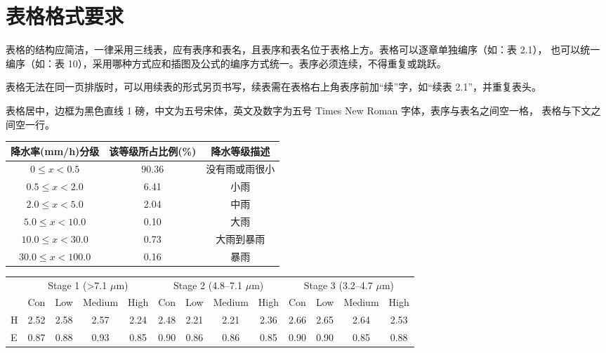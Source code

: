 \section{表格格式要求}

表格的结构应简洁，一律采用三线表，应有表序和表名，且表序和表名位于表格上方。表格可以逐章单独编序（如：表 2.1），
也可以统一编序（如：表 10），采用哪种方式应和插图及公式的编序方式统一。表序必须连续，不得重复或跳跃。

表格无法在同一页排版时，可以用续表的形式另页书写，续表需在表格右上角表序前加“续”字，如“续表 2.1”，并重复表头。

表格居中，边框为黑色直线 1 磅，中文为五号宋体，英文及数字为五号 Times New Roman 字体，表序与表名之间空一格，
表格与下文之间空一行。

\begin{center}
  {\songti\fontsize{10.5pt}{12.6pt}\selectfont
  \begin{tabular}{cccc}
    \toprule
    降水率(mm/h)分级 & 该等级所占比例(\%) & \multicolumn{2}{c}{降水等级描述} \\
    \midrule
    $0 \le x < 0.5$     & 90.36 & \multicolumn{2}{c}{没有雨或雨很小} \\
    $0.5 \le x < 2.0$   & 6.41  & \multicolumn{2}{c}{小雨} \\
    $2.0 \le x < 5.0$   & 2.04  & \multicolumn{2}{c}{中雨} \\
    $5.0 \le x < 10.0$  & 0.10  & \multicolumn{2}{c}{大雨} \\
    $10.0 \le x < 30.0$ & 0.73  & \multicolumn{2}{c}{大雨到暴雨} \\
    $30.0 \le x < 100.0$ & 0.16 & \multicolumn{2}{c}{暴雨} \\
    \bottomrule
  \end{tabular}
  }
\end{center}

\begin{center}
  {\songti\fontsize{10.5pt}{12.6pt}\selectfont
  \begin{tabular*}{16.48cm}{@{\extracolsep{\fill}}lcccccccccccc}
    \toprule
    & \multicolumn{4}{c}{Stage 1 (>7.1 $\mu$m)} &
      \multicolumn{4}{c}{Stage 2 (4.8--7.1 $\mu$m)} &
      \multicolumn{4}{c}{Stage 3 (3.2--4.7 $\mu$m)} \\
    \cmidrule(lr){2-5} \cmidrule(lr){6-9} \cmidrule(lr){10-13}
    & Con & Low & Medium & High &
      Con & Low & Medium & High &
      Con & Low & Medium & High \\
    \midrule
    H & 2.52 & 2.58 & 2.57 & 2.24 & 2.48 & 2.21 & 2.21 & 2.36 & 2.66 & 2.65 & 2.64 & 2.53 \\
    E & 0.87 & 0.88 & 0.93 & 0.85 & 0.90 & 0.86 & 0.86 & 0.85 & 0.90 & 0.90 & 0.85 & 0.88 \\
    \bottomrule
  \end{tabular*}
  }
\end{center}

